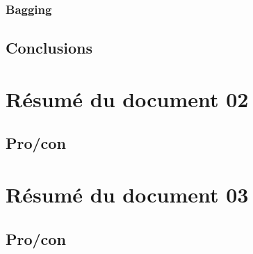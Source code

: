 \subsubsection{Bagging}


\subsection{Conclusions}

\section{Résumé du document 02}
\subsection{Pro/con}

\section{Résumé du document 03}
\subsection{Pro/con}